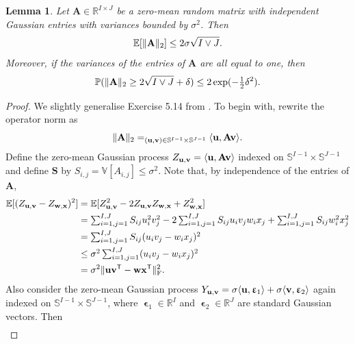 \documentclass[twoside]{article}
\renewcommand{\ss}[1]{_{\text{#1}}}
\newcommand{\vu}{\mathbf{u}}
\newcommand{\vv}{\mathbf{v}}
\newcommand{\vw}{\mathbf{w}}
\newcommand{\vx}{\mathbf{x}}
\newcommand{\vep}{\bm{\upvarepsilon}}
\newcommand{\mA}{\mathbf{A}}
\newcommand{\mS}{\mathbf{S}}
\newcommand{\E}{\mathbb{E}}
\newcommand{\R}{\mathbb{R}}
\newcommand{\V}{\mathbb{V}}
\newcommand{\T}{\text{\textsf{T}}}
\newcommand{\opspace}{}
\let\sup\relax\DeclareMathOperator*{\sup}{sup\opspace}
\renewcommand{\ss}[1]{_{\text{#1}}}        %
\DeclarePairedDelimiter\lra{\langle}{\rangle}    %
\DeclarePairedDelimiter\norm{\|}{\|}             %
\theoremstyle{theoremstyle}
\newtheorem{lemma}[theorem]{Lemma}
\begin{document}
\begin{lemma} \label{lem:expectation_bound}
    Let $\mA \in \R^{I \times J}$ be a zero-mean random matrix with independent Gaussian entries with variances bounded by $\sigma^2$.
    Then
    \begin{equation}
        \E[\norm{\mA}_2] \le 2 \sigma \sqrt{I \lor J}.
    \end{equation}
    Moreover, if the variances of the entries of $\mA$ are all equal to one, then
    \begin{equation}
        \mathbb{P}(\norm{\mA}_2 \ge 2 \sqrt{I \lor J} + \delta) \le 2 \exp(-\tfrac1{2} \delta^2).
    \end{equation}
\end{lemma}
\begin{proof}
    We slightly generalise Exercise 5.14 from \citet{Wainwright:2019:High-Dimensional_Statistics_A_Non-Asymptotic_Viewpoint}.
    To begin with, rewrite the operator norm as
    \begin{equation}
        \norm{\mA}_2
        = \sup_{(\vu, \vv) \in \mathbb{S}^{I - 1} \times \mathbb{S}^{J - 1}} \lra{\vu, \mA \vv}.
    \end{equation}
    Define the zero-mean Gaussian process $Z_{\vu, \vv} = \lra{\vu, \mA \vv}$ indexed on $\mathbb{S}^{I - 1} \times \mathbb{S}^{J - 1}$ and
    define $\mS$ by $S_{i,j} = \V[A_{i,j}] \le \sigma^2$.
    Note that, by independence of the entries of $\mA$,
    \begin{align}
        \E[(Z_{\vu,\vv} - Z_{\vw, \vx})^2]
        &= \E[Z^2_{\vu, \vv} - 2 Z_{\vu,\vv} Z_{\vw, \vx} + Z^2_{\vw, \vx}] \\
        &= \textstyle
            \sum_{i=1,j=1}^{I,J} S_{ij} u_i^2 v_j^2
            - 2 \sum_{i=1,j=1}^{I,J} S_{ij} u_i v_j w_i x_j
            + \sum_{i=1,j=1}^{I,J} S_{ij} w_i^2 x_j^2 \\
        &= \textstyle
            \sum_{i=1,j=1}^{I,J} S_{ij} (u_i v_j - w_i x_j)^2 \\
        &\le \textstyle
            \sigma^2 \sum_{i=1,j=1}^{I,J} (u_i v_j - w_i x_j)^2 \\
        &=
            \sigma^2 \norm{\vu \vv^\T - \vw \vx^\T}\ss{F}^2.
    \end{align}
    Also consider the zero-mean Gaussian process $Y_{\vu, \vv} = \sigma \lra{\vu, \vep_1} + \sigma  \lra{\vv, \vep_2}$ again indexed on $\mathbb{S}^{I - 1} \times \mathbb{S}^{J - 1}$, where $\vep_1 \in \R^I$ and $\vep_2 \in \R^J$ are standard Gaussian vectors.
    Then
    \begin{align}

\end{align}
\end{proof}
\end{document}
